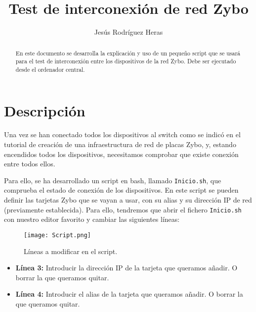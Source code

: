 \documentclass[12pt,letterpaper]{article}
\title{Test de interconexión de red Zybo}
\author{Jesús Rodríguez Heras}
\begin{document}
	
	\maketitle
	\begin{abstract} %
		\begin{center}
			En este documento se desarrolla la explicación y uso de un pequeño script que se usará para el test de interconexión entre los dispositivos de la red Zybo. Debe ser ejecutado desde el ordenador central.
		\end{center}
	\end{abstract}
	\thispagestyle{empty}
	\newpage
	
	\tableofcontents
	\newpage
	
	
	
	
	\lstset{language=bash, numbers=left, numberstyle=\tiny, numbersep=10pt, firstnumber=1, stepnumber=1, basicstyle=\small\ttfamily, tabsize=2, extendedchars=true, inputencoding=utf8/latin1}

\section{Descripción}
Una vez se han conectado todos los dispositivos al switch como se indicó en el tutorial de creación de una infraestructura de red de placas Zybo, y, estando encendidos todos los dispositivos, necesitamos comprobar que existe conexión entre todos ellos.

Para ello, se ha desarrollado un script en bash, llamado \texttt{Inicio.sh}, que comprueba el estado de conexión de los dispositivos. En este script se pueden definir las tarjetas Zybo que se vayan a usar, con su alias y su dirección IP de red (previamente establecida). Para ello, tendremos que abrir el fichero \texttt{Inicio.sh} con nuestro editor favorito y cambiar las siguientes líneas:
\begin{figure}[h]
	\centering
	\texttt{[image: Script.png]}
	\caption{Líneas a modificar en el script.}
	\label{Líneas a modificar en el script}
\end{figure}
\begin{itemize}
	\item \textbf{Línea 3:} Introducir la dirección IP de la tarjeta que queramos añadir. O borrar la que queramos quitar.
	\item \textbf{Línea 4:} Introducir el alias de la tarjeta que queramos añadir. O borrar la que queramos quitar.
\end{itemize}
\end{document}
